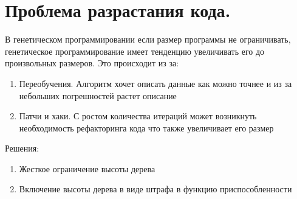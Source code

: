 \section{Проблема разрастания кода.}
В генетическом программировании если размер программы не ограничивать, генетическое программирование имеет тенденцию увеличивать его до произвольных размеров. 
Это происходит из за:
\begin{enumerate} 
	\item Переобучения. Алгоритм хочет описать данные как можно точнее и из за небольших погрешностей растет описание 
	\item Патчи и хаки. С ростом количества итераций может возникнуть необходимость рефакторинга кода что также увеличивает его размер
\end{enumerate} 
Решения:
\begin{enumerate} 
	\item Жесткое ограничение высоты дерева
	\item Включение высоты дерева в виде штрафа в функцию приспособленности
\end{enumerate} 